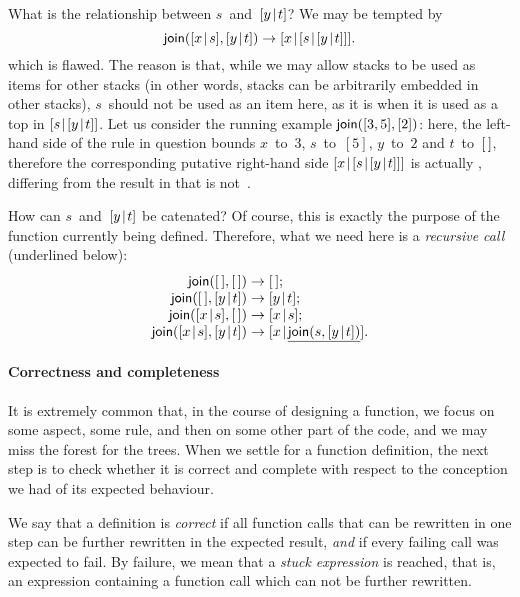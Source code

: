 What is the relationship between \(s\)~and~\([{y}\!\mid\!{t}]\)? We
may be tempted by
\begin{equation*}
\fun{join}(\cons{x}{s},\cons{y}{t}) \rightarrow
  \cons{x}{\cons{s}{\cons{y}{t}}}.
\end{equation*}
which is flawed. The reason is that, while we may allow stacks to be
used as items for other stacks (in other words, stacks can be
arbitrarily embedded in other stacks), \(s\)~should not be used as an
item here, as it is when it is used as a top in
\([{s}\!\mid\!{[{y}\!\mid\!{t}]}]\). Let us consider the running example
\(\textsf{join}([3,5],[2])\): here, the left\hyp{}hand side of the rule
in question bounds \(x\)~to~\(3\), \(s\)~to~\([5]\), \(y\)~to~\(2\)
and \(t\)~to~\([\,]\), therefore the corresponding putative
right\hyp{}hand side \([{x}\!\mid\!{[{s}\!\mid\!{[{y}\!\mid\!{t}]}]}]\) is actually
, differing from the result
 in that \erlcode{[5]} is
not~.

How can \(s\)~and~\([{y}\!\mid\!{t}]\) be catenated? Of course, this is
exactly the purpose of the function  currently being
defined. Therefore, what we need here is a \emph{recursive call}
(underlined below):
\begin{equation*}
\begin{array}{r@{\;}l@{\;}l}
\fun{join}(\el,\el) & \rightarrow & \el;\\
\fun{join}(\el,\cons{y}{t}) & \rightarrow & \cons{y}{t};\\
\fun{join}(\cons{x}{s},\el) & \rightarrow & \cons{x}{s};\\
\fun{join}(\cons{x}{s},\cons{y}{t}) & \rightarrow & \cons{x}{\underline{\fun{join}(s,\cons{y}{t})}}.
\end{array}
\end{equation*}

\paragraph{Correctness and completeness}

It is extremely common that, in the course of designing a function, we
focus on some aspect, some rule, and then on some other part of the
code, and we may miss the forest for the trees. When we settle for a
function definition, the next step is to check whether it is correct
and complete with respect to the conception we had of its expected
behaviour.

We say that a definition is \emph{correct} if all function calls that
can be rewritten in one step can be further rewritten in the expected
result, \emph{and} if every failing call was expected to fail. By
failure, we mean that a \emph{stuck expression} is reached, that is,
an expression containing a function call which can not be further
rewritten.

